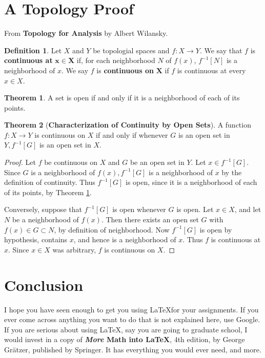 \documentclass[12pt]{article}
\theoremstyle{definition}
\newtheorem{definition}{Definition}[section]
\newtheorem{theorem}{Theorem}[section]
\begin{document}
\section{A Topology Proof}
From \textbf{Topology for Analysis} by Albert Wilansky.
\begin{definition}
Let $X$ and $Y$ be topologial spaces and $f:X \to Y$.  We say that $f$ is \textbf{continuous at} $\boldsymbol{x \in X}$ if, for each neighborhood $N$ of $f(x)$, $f^{-1}[N]$ is a neighborhood of $x$.  We say $f$  is \textbf{continuous on} $\boldsymbol{X}$ if $f$ is continuous at every $x \in X$.
\end{definition}
\begin{theorem}
A set is open if and only if it is a neighborhood of each of its points.\label{T:nbhd}
\end{theorem}
\begin{theorem}[\textbf{Characterization of Continuity by Open Sets}]
A function $f:X \to Y$ is continuous on $X$ if and only if whenever $G$ is an open set in $Y, f^{-1}[G]$ is an open set in $X$.
\end{theorem}
\begin{proof}
Let $f$ be continuous on $X$ and $G$ be an open set in $Y$.  Let $x \in f^{-1}[G]$.  Since $G$ is a neighborhood of $f(x), f^{-1}[G]$ is a neighborhood of $x$ by the definition of continuity.  Thus $f^{-1}[G]$ is open, since it is a neighborhood of each of its points, by Theorem \ref{T:nbhd}.
\par
Conversely, suppose that $f^{-1}[G]$ is open whenever $G$ is open.  Let $x \in X$, and let $N$ be a neighborhood of $f(x)$.  Then there exists an open set $G$ with $f(x) \in G \subset N$, by definition of neighborhood.  Now $f^{-1}[G]$ is open by hypothesis, contains $x$, and hence is a neighborhood of $x$.  Thus $f$ is continuous at $x$.  Since $x \in X$ was arbitrary, $f$ is continuous on $X$.
\end{proof}

\section{Conclusion}
I hope you have seen enough to get you using \LaTeX \thinspace for your assignments.  If you ever come across anything you want to do that is not explained here, use Google.  If you are serious about using \LaTeX, say you are going to graduate school, I would invest in a copy of \textbf{\textit{More} Math into \LaTeX}, 4th edition, by George Gr\"{a}tzer, published by Springer.  It has everything you would ever need, and more.
\end{document}
